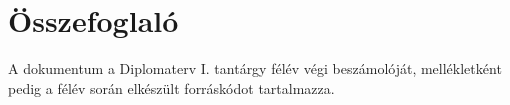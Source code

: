 \chapter*{Összefoglaló}

A dokumentum a Diplomaterv I. tantárgy félév végi beszámolóját, mellékletként pedig a félév során elkészült forráskódot tartalmazza.